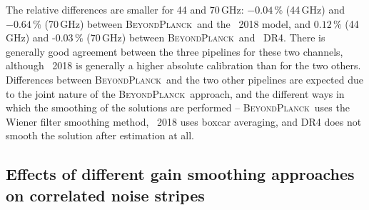 \documentclass[twocolumn]{aa}
\newcommand{\BP}{\textsc{BeyondPlanck}}
\begin{document}
The relative differences are smaller for 44 and 70\,GHz: $-0.04\,\%$  (44\,GHz) and $-0.64\,\%$ (70\,GHz) between \BP\ and the \Planck\ 2018 model, and $0.12\,\%$ (44\,GHz) and -$0.03\,\%$ (70\,GHz) between \BP\ and \Planck\ DR4. There is generally good agreement between the three pipelines for these two channels, although \Planck\ 2018 is generally a higher absolute calibration than for the two others. Differences between \BP\ and the two other pipelines are expected due to the joint nature of the \BP\ approach, and the different ways in which the smoothing of the solutions are performed -- \BP\ uses the Wiener filter smoothing method, \Planck\ 2018 uses boxcar averaging, and DR4 does not smooth the solution after estimation at all.

\subsection{Effects of different gain smoothing approaches on correlated noise stripes}
\end{document}

